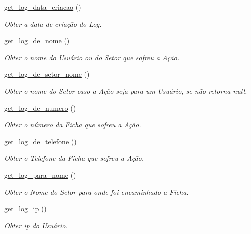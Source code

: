 \begin{DoxyCompactItemize}
\hyperlink{class_class_logs_a407b29a24c5deb4125384b32f92b17db}{get\+\_\+log\+\_\+data\+\_\+criacao} ()
\begin{DoxyCompactList}\small\item\em Obter a data de criação do Log. \end{DoxyCompactList}\item 
\hyperlink{class_class_logs_a50549ddf425a8f141dc9e05479611452}{get\+\_\+log\+\_\+de\+\_\+nome} ()
\begin{DoxyCompactList}\small\item\em Obter o nome do Usuário ou do Setor que sofreu a Ação. \end{DoxyCompactList}\item 
\hyperlink{class_class_logs_a2d4010eed611f258da9452e07166f475}{get\+\_\+log\+\_\+de\+\_\+setor\+\_\+nome} ()
\begin{DoxyCompactList}\small\item\em Obter o nome do Setor caso a Ação seja para um Usuário, se não retorna null. \end{DoxyCompactList}\item 
\hyperlink{class_class_logs_a9bc8d06ed7bddb98e3748f8692bf3082}{get\+\_\+log\+\_\+de\+\_\+numero} ()
\begin{DoxyCompactList}\small\item\em Obter o número da Ficha que sofreu a Ação. \end{DoxyCompactList}\item 
\hyperlink{class_class_logs_ac099cce47c31507d7c68b27af923cabd}{get\+\_\+log\+\_\+de\+\_\+telefone} ()
\begin{DoxyCompactList}\small\item\em Obter o Telefone da Ficha que sofreu a Ação. \end{DoxyCompactList}\item 
\hyperlink{class_class_logs_a47f48e084a822dd6a389575e01acea00}{get\+\_\+log\+\_\+para\+\_\+nome} ()
\begin{DoxyCompactList}\small\item\em Obter o Nome do Setor para onde foi encaminhado a Ficha. \end{DoxyCompactList}\item 
\hyperlink{class_class_logs_abedfbfb863da4fa609016ce17d504ab3}{get\+\_\+log\+\_\+ip} ()
\begin{DoxyCompactList}\small\item\em Obter ip do Usuário. \end{DoxyCompactList}\end{DoxyCompactItemize}


